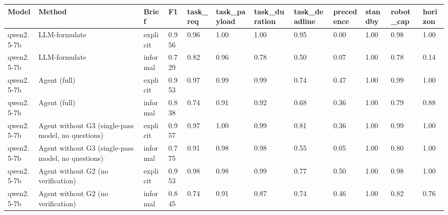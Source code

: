 \begin{tabular}{llllllllllll}
\toprule
Model & Method & Brief & F1 & task\_req & task\_payload & task\_duration & task\_deadline & precedence & standby & robot\_cap & horizon \\
\midrule
qwen2.5-7b & LLM-formulate & explicit & 0.956 & 0.96 & 1.00 & 1.00 & 0.95 & 0.00 & 1.00 & 0.98 & 1.00 \\
qwen2.5-7b & LLM-formulate & informal & 0.729 & 0.82 & 0.96 & 0.78 & 0.50 & 0.07 & 1.00 & 0.78 & 0.14 \\
qwen2.5-7b & Agent (full) & explicit & 0.953 & 0.97 & 0.99 & 0.99 & 0.74 & 0.47 & 1.00 & 0.99 & 1.00 \\
qwen2.5-7b & Agent (full) & informal & 0.838 & 0.74 & 0.91 & 0.92 & 0.68 & 0.36 & 1.00 & 0.79 & 0.88 \\
qwen2.5-7b & Agent without G3 (single-pass model, no questions) & explicit & 0.957 & 0.97 & 1.00 & 0.99 & 0.81 & 0.36 & 1.00 & 0.99 & 1.00 \\
qwen2.5-7b & Agent without G3 (single-pass model, no questions) & informal & 0.775 & 0.91 & 0.98 & 0.98 & 0.55 & 0.05 & 1.00 & 0.80 & 1.00 \\
qwen2.5-7b & Agent without G2 (no verification) & explicit & 0.953 & 0.98 & 0.98 & 0.99 & 0.77 & 0.50 & 1.00 & 0.98 & 1.00 \\
qwen2.5-7b & Agent without G2 (no verification) & informal & 0.845 & 0.74 & 0.91 & 0.87 & 0.74 & 0.46 & 1.00 & 0.82 & 0.76 \\
\bottomrule
\end{tabular}
